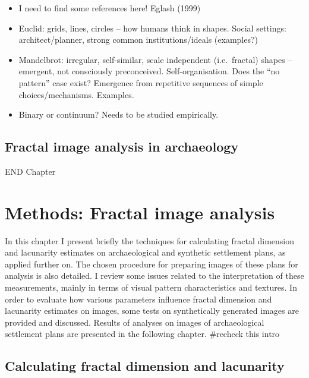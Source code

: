 \documentclass[
  12pt,
]{book}
\begin{document}
\begin{itemize}
\item
  I need to find some references here! Eglash (1999)
\item
  Euclid: grids, lines, circles -- how humans think in shapes. Social settings: architect/planner, strong common institutions/ideals (examples?)
\item
  Mandelbrot: irregular, self-similar, scale independent (i.e.~fractal) shapes -- emergent, not consciously preconceived. Self-organisation. Does the ``no pattern'' case exist? Emergence from repetitive sequences of simple choices/mechanisms. Examples.
\item
  Binary or continuum? Needs to be studied empirically.
\end{itemize}

\hypertarget{image-archaeo}{%
\section{Fractal image analysis in archaeology}\label{image-archaeo}}

END Chapter

\hypertarget{images-methods}{%
\chapter{Methods: Fractal image analysis}\label{images-methods}}

In this chapter I present briefly the techniques for calculating fractal dimension and lacunarity estimates on archaeological and synthetic settlement plans, as applied further on. The chosen procedure for preparing images of these plans for analysis is also detailed. I review some issues related to the interpretation of these measurements, mainly in terms of visual pattern characteristics and textures. In order to evaluate how various parameters influence fractal dimension and lacunarity estimates on images, some tests on synthetically generated images are provided and discussed. Results of analyses on images of archaeological settlement plans are presented in the following chapter. \#recheck this intro

\hypertarget{images-procedure}{%
\section{Calculating fractal dimension and lacunarity}\label{images-procedure}}
\end{document}
